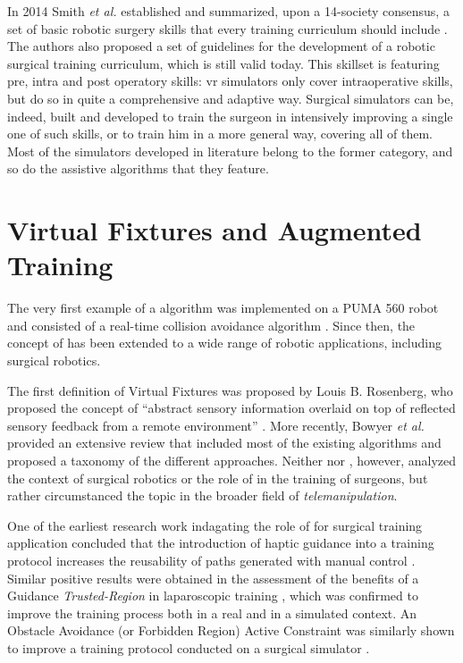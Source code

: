 \documentclass[../main.tex]{subfiles}
\begin{document}
In 2014 Smith \textit{et al.} established and summarized, upon a 14-society consensus, a set of basic robotic surgery skills that every training curriculum should include \cite{Smith2014}. 
The authors also proposed a set of guidelines for the development of a robotic surgical training curriculum, which is still valid today. This skillset is featuring pre, intra and post operatory skills: \ac{vr} simulators only cover intraoperative skills, but do so in quite a comprehensive and adaptive way. Surgical simulators can be, indeed, built and developed to train the surgeon in intensively improving a single one of such skills, or to train him in a more general way, covering all of them. Most of the \vr simulators developed in literature belong to the former category, and so do the assistive algorithms that they feature.

\section{Virtual Fixtures and Augmented Training}
The very first example of a \vf algorithm was implemented on a PUMA 560 robot and consisted of a real-time collision avoidance algorithm \cite{Khatib1986}. Since then, the concept of \vf has been extended to a wide range of robotic applications, including surgical robotics. 

The first definition of Virtual Fixtures was proposed by Louis B. Rosenberg, who proposed the concept of ``abstract sensory information overlaid on top of reflected sensory feedback from a remote environment'' \cite{Rosenberg1993}. More recently, Bowyer \textit{et al.} \cite{Bowyer2014} provided an extensive review that included most of the existing \vf algorithms and proposed a taxonomy of the different approaches. Neither \cite{Rosenberg1993} nor \cite{Bowyer2014}, however, analyzed the context of surgical robotics or the role of \vf in the training of surgeons, but rather circumstanced the topic in the broader field of \textit{telemanipulation}. 

One of the earliest research work indagating the role of \vfs for surgical training application concluded that the introduction of haptic guidance into a training protocol increases the reusability of paths generated with manual control \cite{Payandeh2002}. Similar positive results were obtained in the assessment of the benefits of a Guidance \textit{Trusted-Region} \vf in laparoscopic training \cite{Iranfar2018}, which was confirmed to improve the training process both in a real and in a simulated context. An Obstacle Avoidance (or Forbidden Region) Active Constraint was similarly shown to improve a training protocol conducted on a surgical simulator \cite{Hong2016}.

% 
% 
\end{document}
